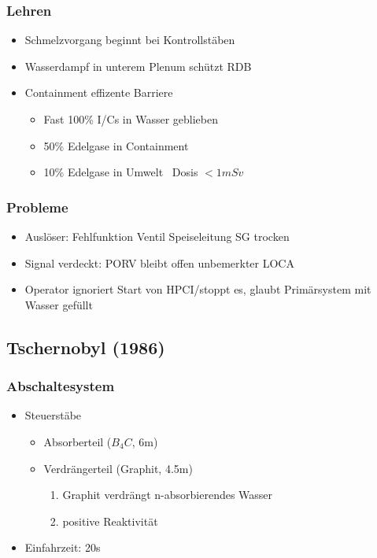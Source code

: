 \documentclass[12pt]{article}
\begin{document}
\subsubsection{Lehren}
\begin{itemize}
	\item Schmelzvorgang beginnt bei Kontrollstäben
	\item Wasserdampf in unterem Plenum schützt RDB
	\item Containment effizente Barriere
		\begin{itemize}
			\item Fast 100\% I/Cs in Wasser geblieben
			\item 50\% Edelgase in Containment
			\item 10\% Edelgase in Umwelt \textrightarrow\ Dosis \(<1 mSv\)
		\end{itemize}
\end{itemize}

\subsubsection{Probleme}
\begin{itemize}
	\item Auslöser: Fehlfunktion Ventil Speiseleitung \textrightarrow SG trocken
	\item Signal verdeckt: PORV bleibt offen \textrightarrow unbemerkter LOCA
	\item Operator ignoriert Start von HPCI/stoppt es, glaubt Primärsystem mit Wasser gefüllt
\end{itemize}

\subsection{Tschernobyl (1986)}

\subsubsection{Abschaltesystem}
\begin{itemize}
	\item Steuerstäbe
		\begin{itemize}
			\item Absorberteil (\(B_4C\), 6m)
			\item Verdrängerteil (Graphit, 4.5m)
				\begin{enumerate}[label = \textrightarrow]
					\item Graphit verdrängt n-absorbierendes Wasser
					\item positive Reaktivität
				\end{enumerate}
		\end{itemize}
	\item Einfahrzeit: 20s
\end{itemize}
\end{document}
